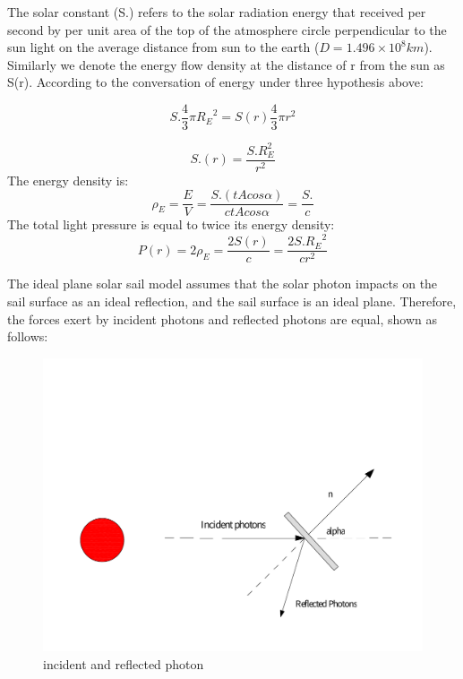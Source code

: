 \documentclass[../Paper.tex]{subfiles}
\begin{document}
The solar constant (S.) refers to the solar radiation energy that received per second by per unit area of the top of the atmosphere circle perpendicular to the sun light on the average distance from sun to the earth ($D=1.496\times10^8km$). Similarly we denote the energy flow density at the distance of r from the sun as S(r).
According to the conversation of energy under three hypothesis above:

\[S.\dfrac{4}{3}\pi{R_E}^2=S(r)\dfrac{4}{3}\pi r^2\]

\begin{equation}
S.(r)=\dfrac{S.R_E^2}{r^2}
\end{equation}
The energy density is:
\begin{equation}
\rho_E=\dfrac{E}{V}=\dfrac{S.(tAcos\alpha)}{c tAcos\alpha}=\dfrac{S.}{c}
\end{equation}
The total light pressure is equal to twice its energy density:
\begin{equation}
P(r)=2\rho_E=\dfrac{2S(r)}{c}=\dfrac{2S.{R_E}^2}{cr^2}
\end{equation}

The ideal plane solar sail model assumes that the solar photon impacts on the sail surface as an ideal reflection, and t{}he sail surface is an ideal plane. Therefore, the forces exert by incident photons and reflected photons are equal, shown as follows:

\begin{figure}
 \centering
 \includegraphics[scale=0.3]{../Figures/lightpressure.pdf}
 \caption{incident and reflected photon}
\end{figure}
\end{document}
